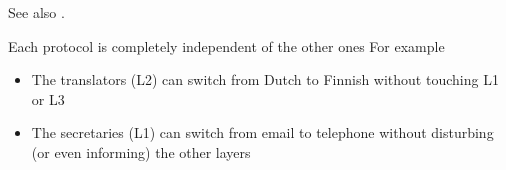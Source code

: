 See also .

\begin{frame}%
  \begin{center}
    \label{fig:translator}
  \end{center}
\end{frame}

\begin{frame}
  \begin{block}{Each protocol is completely independent of the other ones}
    For example
    \begin{itemize}
    \item The translators (L2) can switch from Dutch to Finnish without touching L1 or L3
    \item The secretaries (L1) can switch from email to telephone without disturbing (or
      even informing) the other layers
    \end{itemize}
  \end{block}
\end{frame}

